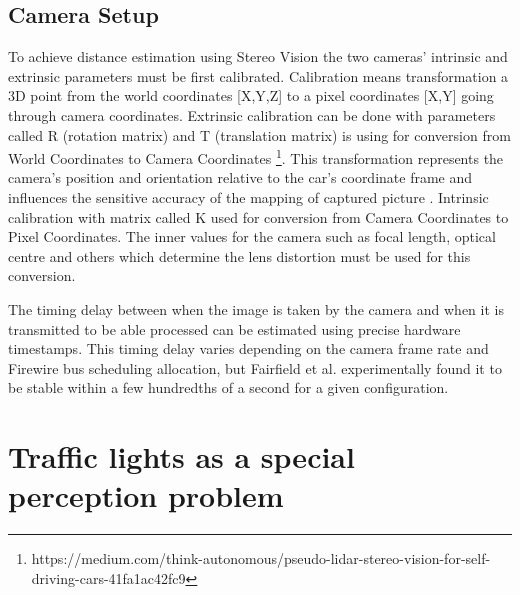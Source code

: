 \documentclass[letterpaper, 10 pt, conference]{ieeeconf} %
\begin{document}
\subsection{Camera Setup}

To achieve distance estimation using Stereo Vision the two cameras' intrinsic and extrinsic parameters must be first calibrated. Calibration means transformation a 3D point from the world coordinates [X,Y,Z] to a pixel coordinates [X,Y] going through camera coordinates. Extrinsic calibration can be done with parameters called R (rotation matrix) and T (translation matrix) is using for conversion from World Coordinates to Camera Coordinates \footnote{https://medium.com/think-autonomous/pseudo-lidar-stereo-vision-for-self-driving-cars-41fa1ac42fc9}. This transformation represents the camera’s position and orientation relative to the car’s coordinate frame and influences the sensitive accuracy of the mapping of captured picture \cite{c4}. Intrinsic calibration with matrix called K used for conversion from Camera Coordinates to Pixel Coordinates. The inner values for the camera such as focal length, optical centre and others which determine the lens distortion must be used for this conversion. 

The timing delay between when the image is taken by the camera and when it is transmitted to be able processed can be estimated using precise hardware timestamps. This timing delay varies depending on the camera frame rate and Firewire bus scheduling allocation, but Fairfield et al. experimentally found it to be stable within a few hundredths of a second for a given configuration.
 
\section{Traffic lights as a special perception problem}
\end{document}
